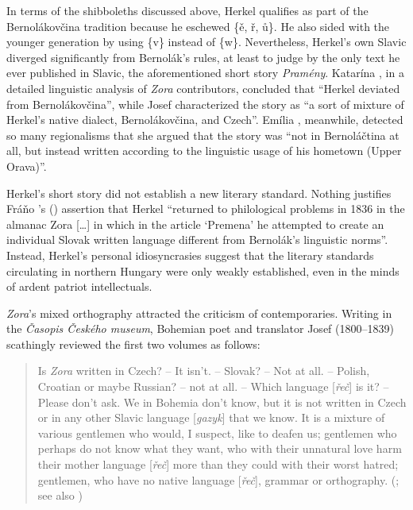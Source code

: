 In terms of the shibboleths discussed above, Herkel qualifies as part of the Berno\-lákovčina tradition because he eschewed \{ě, ř, ů\}. He also sided with the younger generation by using \{v\} instead of \{w\}. Nevertheless, Herkel’s own Slavic diverged significantly from Bernolák’s rules, at least to judge by the only text he ever published in Slavic, the aforementioned short story \textit{Pramény}. Katarína \citet[102]{habovstiakova_almanach_1970}, in a detailed linguistic analysis of \textit{Zora} contributors, concluded that “Herkel deviated from Bernolákovčina”, while Josef \citet[197]{vavro_jan_1961} characterized the story as “a sort of mixture of Herkel’s native dialect, Berno\-lákovčina, and Czech”. Emília \citet[222]{urhegyi_almanach_1984}, meanwhile, detected so many regionalisms that she argued that the story was “not in Bernoláčtina at all, but instead written according to the linguistic usage of his hometown (Upper Orava)”.

Herkel’s short story did not establish a new literary standard. Nothing justifies Fráňo \citeauthor{ruttkay_dejiny_1999}’s (\citeyear[65]{ruttkay_dejiny_1999}) assertion that Herkel “returned to philological problems in 1836 in the almanac Zora […] in which in the article ‘Premena’ he attempted to create an individual Slovak written language different from Bernolák’s linguistic norms”. Instead, Herkel’s personal idiosyncrasies suggest that the literary standards circulating in northern Hungary were only weakly established, even in the minds of ardent patriot intellectuals.

\textit{Zora}’s mixed orthography attracted the criticism of contemporaries. Writing in the \textit{Časopis Českého museum}, Bohemian poet and translator Josef \citeauthor{chmelensky_literatura_1836} (1800--1839) scathingly reviewed the first two volumes as follows:

\begin{quote}
    Is \textit{Zora} written in Czech? – It isn’t. – Slovak? – Not at all. – Polish, Croatian or maybe Russian? – not at all. – Which language [\textit{řeč}] is it? – Please don’t ask. We in Bohemia don’t know, but it is not written in Czech or in any other Slavic language [\textit{gazyk}] that we know. It is a mixture of various gentlemen who would, I suspect, like to deafen us; gentlemen who perhaps do not know what they want, who with their unnatural love harm their mother language [\textit{řeč}] more than they could with their worst hatred; gentlemen, who have no native language [\textit{řeč}], grammar or orthography. (\cite[208]{chmelensky_literatura_1836}; see also \cite[144]{matovcik_martin_1971})
\end{quote}

